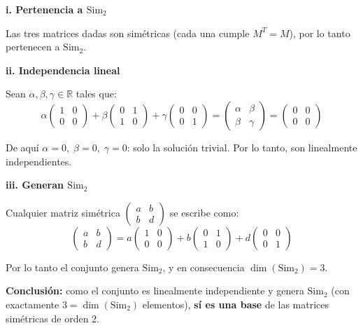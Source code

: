 \documentclass[12pt]{article}
\begin{document}
\begin{enumerate}[label=\alph*.-]
    \textbf{i. Pertenencia a $\text{Sim}_2$}

    Las tres matrices dadas son simétricas (cada una cumple $M^T=M$), por lo tanto pertenecen a $\text{Sim}_2$.

    \textbf{ii. Independencia lineal}

    Sean $\alpha,\beta,\gamma\in\mathbb{R}$ tales que:
    \[
    \alpha\begin{pmatrix}1&0\\0&0\end{pmatrix}+\beta\begin{pmatrix}0&1\\1&0\end{pmatrix}+\gamma\begin{pmatrix}0&0\\0&1\end{pmatrix} = \begin{pmatrix}\alpha&\beta\\\beta&\gamma\end{pmatrix} = \begin{pmatrix}0&0\\0&0\end{pmatrix}
    \]

    De aquí $\alpha=0,\;\beta=0,\;\gamma=0$: solo la solución trivial. Por lo tanto, son linealmente independientes.

    \textbf{iii. Generan $\text{Sim}_2$}

    Cualquier matriz simétrica $\begin{pmatrix}a&b\\b&d\end{pmatrix}$ se escribe como:
    \[
    \begin{pmatrix}a&b\\b&d\end{pmatrix} = a\begin{pmatrix}1&0\\0&0\end{pmatrix}+b\begin{pmatrix}0&1\\1&0\end{pmatrix}+d\begin{pmatrix}0&0\\0&1\end{pmatrix}
    \]

    Por lo tanto el conjunto genera $\text{Sim}_2$, y en consecuencia $\dim(\text{Sim}_2)=3$.

    \textbf{Conclusión:} como el conjunto es linealmente independiente y genera $\text{Sim}_2$ (con exactamente $3=\dim(\text{Sim}_2)$ elementos), \textbf{sí es una base} de las matrices simétricas de orden 2.


\end{enumerate}
\end{document}
